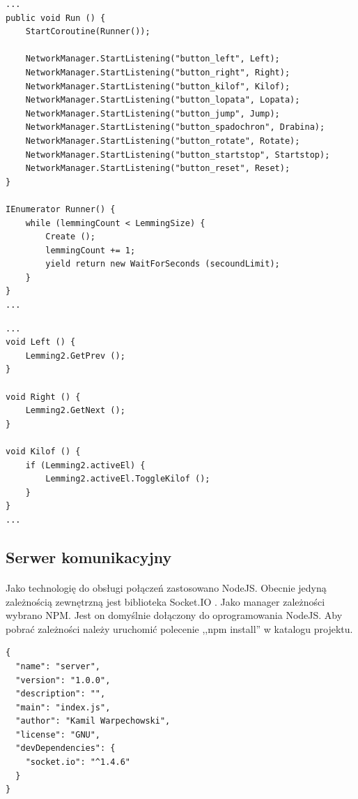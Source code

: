 \begin{lstlisting}[language=CSharp]
...
public void Run () {
	StartCoroutine(Runner());

	NetworkManager.StartListening("button_left", Left);
	NetworkManager.StartListening("button_right", Right);
	NetworkManager.StartListening("button_kilof", Kilof);
	NetworkManager.StartListening("button_lopata", Lopata);
	NetworkManager.StartListening("button_jump", Jump);
	NetworkManager.StartListening("button_spadochron", Drabina);
	NetworkManager.StartListening("button_rotate", Rotate);
	NetworkManager.StartListening("button_startstop", Startstop);
	NetworkManager.StartListening("button_reset", Reset);
}

IEnumerator Runner() {
	while (lemmingCount < LemmingSize) {
		Create ();
		lemmingCount += 1;
		yield return new WaitForSeconds (secoundLimit);
	}
}
...
\end{lstlisting}

\begin{lstlisting}[language=CSharp]
...
void Left () {
	Lemming2.GetPrev ();
}

void Right () {
	Lemming2.GetNext ();
}

void Kilof () {
	if (Lemming2.activeEl) {
		Lemming2.activeEl.ToggleKilof ();
	}
}
...
\end{lstlisting}

\subsection{Serwer komunikacyjny}
\paragraph{}
Jako technologię do obsługi połączeń zastosowano NodeJS. Obecnie jedyną zależnością zewnętrzną jest biblioteka Socket.IO \cite{socket}.
Jako manager zależności wybrano NPM. Jest on domyślnie dołączony do oprogramowania NodeJS. Aby pobrać zależności należy uruchomić polecenie ,,npm install'' w katalogu projektu.

\begin{lstlisting}[language=CSharp]
{
  "name": "server",
  "version": "1.0.0",
  "description": "",
  "main": "index.js",
  "author": "Kamil Warpechowski",
  "license": "GNU",
  "devDependencies": {
    "socket.io": "^1.4.6"
  }
}
\end{lstlisting}

